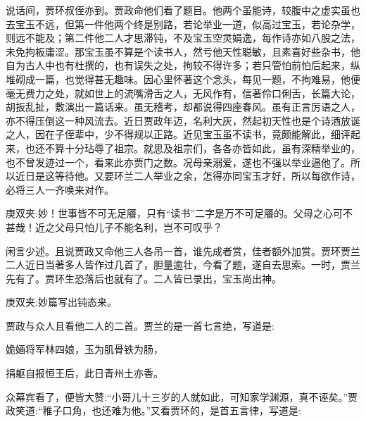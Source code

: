 \begin{parag}
    说话间，贾环叔侄亦到。贾政命他们看了题目。他两个虽能诗，较腹中之虚实虽也去宝玉不远，但第一件他两个终是别路，若论举业一道，似高过宝玉，若论杂学，则远不能及；第二件他二人才思滞钝，不及宝玉空灵娟逸，每作诗亦如八股之法，未免拘板庸涩。那宝玉虽不算是个读书人，然亏他天性聪敏，且素喜好些杂书，他自为古人中也有杜撰的，也有误失之处，拘较不得许多；若只管怕前怕后起来，纵堆砌成一篇，也觉得甚无趣味。因心里怀著这个念头，每见一题，不拘难易，他便毫无费力之处，就如世上的流嘴滑舌之人，无风作有，信著伶口俐舌，长篇大论，胡扳乱扯，敷演出一篇话来。虽无稽考，却都说得四座春风。虽有正言厉语之人，亦不得压倒这一种风流去。近日贾政年迈，名利大灰，然起初天性也是个诗酒放诞之人，因在子侄辈中，少不得规以正路。近见宝玉虽不读书，竟颇能解此，细评起来，也还不算十分玷辱了祖宗。就思及祖宗们，各各亦皆如此，虽有深精举业的，也不曾发迹过一个，看来此亦贾门之数。况母亲溺爱，遂也不强以举业逼他了。所以近日是这等待他。又要环兰二人举业之余，怎得亦同宝玉才好，所以每欲作诗，必将三人一齐唤来对作。\begin{note}庚双夹:妙！世事皆不可无足餍，只有“读书”二字是万不可足餍的。父母之心可不甚哉！近之父母只怕儿子不能名利，岂不可叹乎？\end{note}
\end{parag}


\begin{parag}
    闲言少述。且说贾政又命他三人各吊一首，谁先成者赏，佳者额外加赏。贾环贾兰二人近日当著多人皆作过几首了，胆量逾壮，今看了题，遂自去思索。一时，贾兰先有了。贾环生恐落后也就有了。二人皆已录出，宝玉尚出神。\begin{note}庚双夹:妙篇写出钝态来。\end{note}贾政与众人且看他二人的二首。贾兰的是一首七言绝，写道是:
\end{parag}


\begin{poem}
    \begin{pl}姽婳将军林四娘，玉为肌骨铁为肠，\end{pl}

    \begin{pl}捐躯自报恒王后，此日青州土亦香。\end{pl}
\end{poem}


\begin{parag}
    众幕宾看了，便皆大赞:“小哥儿十三岁的人就如此，可知家学渊源，真不诬矣。”贾政笑道:“稚子口角，也还难为他。”又看贾环的，是首五言律，写道是:
\end{parag}


